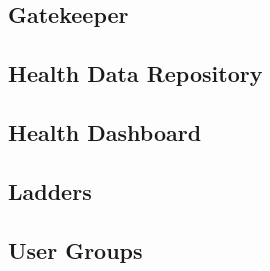     \subsection{Gatekeeper}

    \subsection{Health Data Repository}

    \subsection{Health Dashboard}

    \subsection{Ladders}

    \subsection{User Groups}
